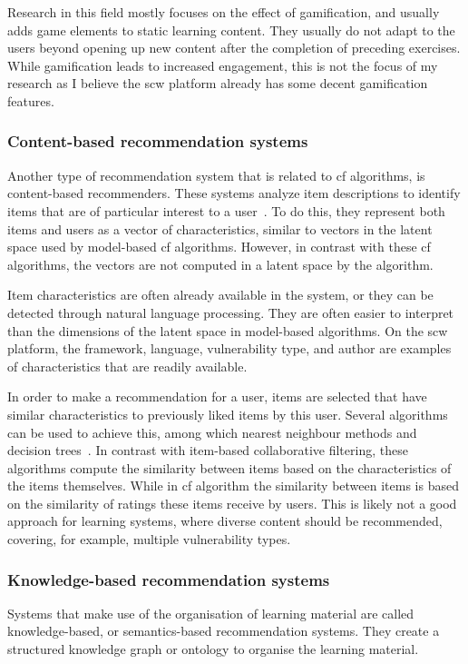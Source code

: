 Research in this field mostly focuses on the effect of gamification, and usually adds game elements to static learning content.
They usually do not adapt to the users beyond opening up new content after the completion of preceding exercises.
While gamification leads to increased engagement, this is not the focus of my research as I believe the \gls{scw} platform already has some decent gamification features.

\subsubsection{Content-based recommendation systems}
Another type of recommendation system that is related to \gls{cf} algorithms, is content-based recommenders.
These systems analyze item descriptions to identify items that are of particular interest to a user~\cite{pazzani2007content}.
To do this, they represent both items and users as a vector of characteristics, similar to vectors in the latent space used by model-based \gls{cf} algorithms.
However, in contrast with these \gls{cf} algorithms, the vectors are not computed in a latent space by the algorithm.

Item characteristics are often already available in the system, or they can be detected through natural language processing.
They are often easier to interpret than the dimensions of the latent space in model-based algorithms.
On the \gls{scw} platform, the framework, language, vulnerability type, and author are examples of characteristics that are readily available.

In order to make a recommendation for a user, items are selected that have similar characteristics to previously liked items by this user.
Several algorithms can be used to achieve this, among which nearest neighbour methods and decision trees~\cite{pazzani2007content}.
In contrast with item-based collaborative filtering, these algorithms compute the similarity between items based on the characteristics of the items themselves.
While in \gls{cf} algorithm the similarity between items is based on the similarity of ratings these items receive by users.
This is likely not a good approach for learning systems, where diverse content should be recommended, covering, for example, multiple vulnerability types.

\subsubsection{Knowledge-based recommendation systems}
Systems that make use of the organisation of learning material are called knowledge-based, or semantics-based recommendation systems.
They create a structured knowledge graph or ontology to organise the learning material.

